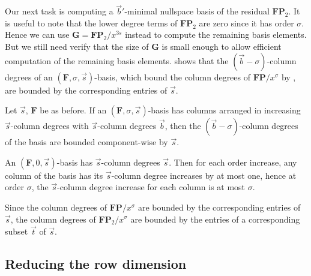 Our next task is computing a $\vec{b}'$-minimal nullspace basis of
the residual $\mathbf{F}\mathbf{P}_{2}$. It is useful to note that
the lower degree terms of $\mathbf{F}\mathbf{P}_{2}$ are zero since
it has order $\sigma$. Hence we can use $\mathbf{G}=\mathbf{F}\mathbf{P}_{2}/x^{3s}$
instead to compute the remaining basis elements. But we still need
verify that the size of $\mathbf{G}$ is small enough to allow efficient
computation of the remaining basis elements. 
shows that the $\left(\vec{b}-\sigma\right)$-column degrees of an
$(\mathbf{F},\sigma,\vec{s})$-basis, which bound the column degrees
of $\mathbf{F}\mathbf{P}/x^{\sigma}$ by ,
are bounded by the corresponding entries of $\vec{s}$.
\begin{lem}
\label{lem:boundOnShiftedDegrees}Let $\vec{s}$, $\mathbf{F}$ be
as before. If an $(\mathbf{F},\sigma,\vec{s})$-basis has columns
arranged in increasing $\vec{s}$-column degrees with $\vec{s}$-column
degrees $\vec{b}$, then the $(\vec{b}-\sigma)$-column degrees of
the basis are bounded component-wise by $\vec{s}$.\end{lem}
\begin{pf}
An $(\mathbf{F},0,\vec{s})$-basis has $\vec{s}$-column degrees $\vec{s}$.
Then for each order increase, any column of the basis has its $\vec{s}$-column
degree increases by at most one, hence at order $\sigma$, the $\vec{s}$-column
degree increase for each column is at most $\sigma$.
\end{pf}
Since the column degrees of $\mathbf{F}\mathbf{P}/x^{\sigma}$ are
bounded by the corresponding entries of $\vec{s}$, the column degrees
of $\mathbf{F}\mathbf{P}_{2}/x^{\sigma}$ are bounded by the entries
of a corresponding subset $\vec{t}$ of $\vec{s}$.

\begin{comment}
Note the difference between \prettyref{lem:boundOfSumOfShiftedDegreesOfNullspaceBasis}
and \prettyref{lem:boundOnShiftedDegrees}. In \prettyref{lem:boundOfSumOfShiftedDegreesOfNullspaceBasis},
we consider only the shifted degree of a nullspace basis, where as
in \prettyref{lem:boundOnShiftedDegrees} applies to a order basis
but the order is subtracted from the degrees.
\end{comment}



\subsection{\label{sub:continueComputingNullspaceBasisByRows}Reducing the row
dimension }


